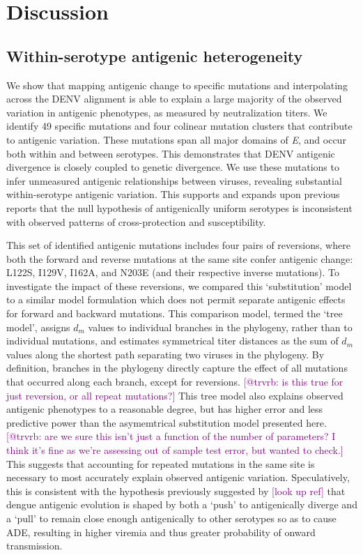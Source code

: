 \documentclass[11pt,oneside,letterpaper]{article}
\def\sbc#1{\textcolor{purple}{[#1]}}
\begin{document}
\pagebreak

\section*{Discussion}

\subsection*{Within-serotype antigenic heterogeneity}

We show that mapping antigenic change to specific mutations and interpolating across the DENV alignment is able to explain a large majority of the observed variation in antigenic phenotypes, as measured by neutralization titers.
We identify 49 specific mutations and four colinear mutation clusters that contribute to antigenic variation.
These mutations span all major domains of \textit{E}, and occur both within and between serotypes.
This demonstrates that DENV antigenic divergence is closely coupled to genetic divergence.
We use these mutations to infer unmeasured antigenic relationships between viruses, revealing substantial within-serotype antigenic variation.
This supports and expands upon previous reports \citep{katzelnick2015dengue} that the null hypothesis of antigenically uniform serotypes is inconsistent with observed patterns of cross-protection and susceptibility.

This set of identified antigenic mutations includes four pairs of reversions, where both the forward and reverse mutations at the same site confer antigenic change: L122S, I129V, I162A, and N203E (and their respective inverse mutations).
To investigate the impact of these reversions, we compared this `substitution' model to a similar model formulation which does not permit separate antigenic effects for forward and backward mutations.
This comparison model, termed the `tree model', assigns $d_m$ values to individual branches in the phylogeny, rather than to individual mutations, and estimates symmetrical titer distances as the sum of $d_m$ values along the shortest path separating two viruses in the phylogeny.
By definition, branches in the phylogeny directly capture the effect of all mutations that occurred along each branch, except for reversions.
\sbc{@trvrb: is this true for just reversion, or all repeat mutations?}
This tree model also explains observed antigenic phenotypes to a reasonable degree, but has higher error and less predictive power than the asymemtrical substitution model presented here.
\sbc{@trvrb: are we sure this isn't just a function of the number of parameters? I think it's fine as we're assessing out of sample test error, but wanted to check.}
This suggests that accounting for repeated mutations in the same site is necessary to most accurately explain observed antigenic variation.
Speculatively, this is consistent with the hypothesis previously suggested by \sbc{look up ref} that dengue antigenic evolution is shaped by both a `push' to antigenically diverge and a `pull' to remain close enough antigenically to other serotypes so as to cause ADE, resulting in higher viremia and thus greater probability of onward transmission.
\end{document}
